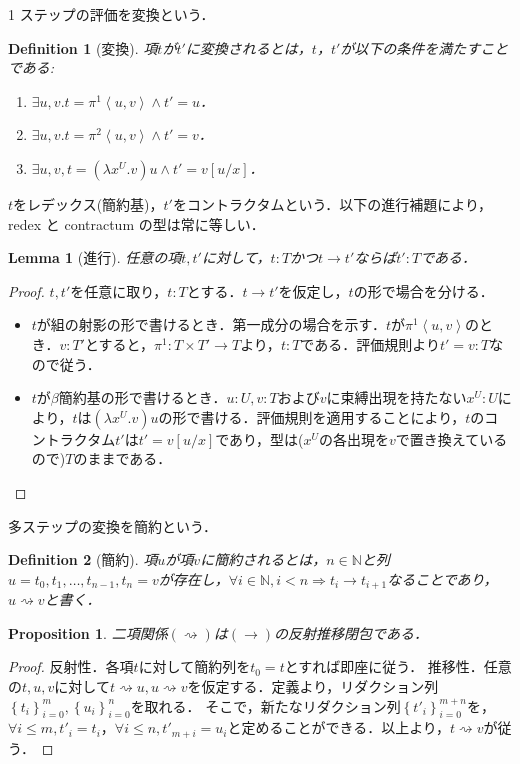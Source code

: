 \documentclass[a4paper,10pt,platex, dvipdfmx]{jsarticle}
\newtheorem{definition}{Definition}
\newtheorem{lemma}{Lemma}
\newtheorem{proposition}{Proposition}
\begin{document}
1 ステップの評価を変換という．
\begin{definition}[変換]
項$t$が$t'$に変換されるとは，$t$，$t'$が以下の条件を満たすことである:\begin{enumerate}
\item $\exists u, v. t = \pi^{1}\left<u, v\right>\land t' = u$．
\item $\exists u, v. t = \pi^{2}\left<u, v\right>\land t' = v$．
\item $\exists u, v, t = (\lambda x^{U}.v) u \land t' = v\left[u/x\right]$．
\end{enumerate}
\end{definition}
$t$をレデックス(簡約基)，$t'$をコントラクタムという．以下の進行補題により，redex と contractum の型は常に等しい．
\begin{lemma}[進行]
    任意の項$t, t'$に対して，$t: T$かつ$t\rightarrow t'$ならば$t' : T$である．
\end{lemma}
\begin{proof}
$t, t'$を任意に取り，$t:T$とする．$t\rightarrow t'$を仮定し，$t$の形で場合を分ける．
\begin{itemize}
    \item $t$が組の射影の形で書けるとき．第一成分の場合を示す．$t$が$\pi^{1}\left<u, v\right>$のとき．$v:T'$とすると，$\pi^{1}: T\times T'\rightarrow T$より，$t : T$である．評価規則より$t' = v : T$なので従う．
    \item $t$が$\beta$簡約基の形で書けるとき．$u: U, v: T$および$v$に束縛出現を持たない$x^{U}:U$により，$t$は$(\lambda x^{U}. v)u$の形で書ける．評価規則を適用することにより，$t$のコントラクタム$t'$は$t' = v\left[u/x\right]$であり，型は($x^{U}$の各出現を$v$で置き換えているので)$T$のままである．
\end{itemize}
\end{proof}
多ステップの変換を簡約という．
\begin{definition}[簡約]
項$u$が項$v$に簡約されるとは，$n\in\mathbb{N}$と列$u = t_{0}, t_{1},\ldots, t_{n- 1}, t_{n} = v$が存在し，$\forall i\in\mathbb{N}, i < n \Rightarrow t_{i}\rightarrow t_{i + 1}$なることであり，$u\rightsquigarrow v$と書く．
\end{definition}
\begin{proposition}
    二項関係$(\rightsquigarrow)$は$(\rightarrow)$の反射推移閉包である．
\end{proposition}
\begin{proof}
    反射性．各項$t$に対して簡約列を$t_{0} = t$とすれば即座に従う．
    推移性．任意の$t, u, v$に対して$t\rightsquigarrow u, u\rightsquigarrow v$を仮定する．定義より，リダクション列$\left\{t_{i}\right\}_{i = 0}^{m}, \left\{u_{i}\right\}_{i = 0}^{n}$を取れる．
    そこで，新たなリダクション列$\left\{t'_{i}\right\}_{i = 0}^{m+n}$を，$\forall i \leq m, t'_{i} = t_{i}$，$\forall i \leq n, t'_{m + i} = u_{i}$と定めることができる．以上より，$t\rightsquigarrow v$が従う．
\end{proof}
\end{document}

